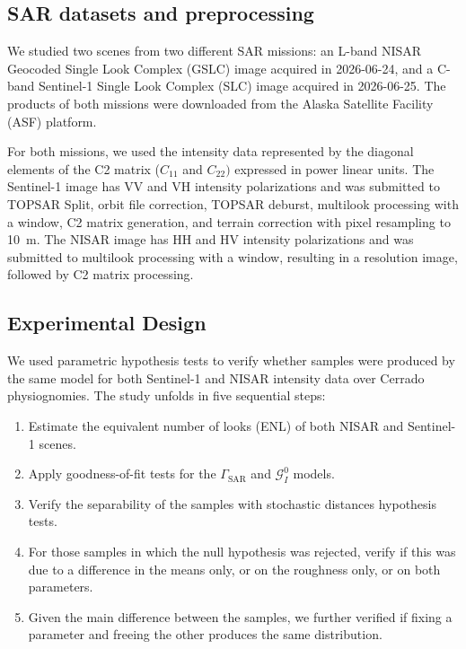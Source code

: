 \subsection{SAR datasets and preprocessing}

We studied two scenes from two different SAR missions: an L-band NISAR Geocoded Single Look Complex (GSLC) image acquired in 2026-06-24, and a C-band Sentinel-1 Single Look Complex (SLC) image acquired in 2026-06-25.
The products of both missions were downloaded from the Alaska Satellite Facility (ASF) platform.

For both missions, we used the intensity data represented by the diagonal elements of the C2 matrix ($C_{11}$ and $C_{22})$ expressed in power linear units.
The Sentinel-1 image has $\text{VV}$ and $\text{VH}$ intensity polarizations and was submitted to TOPSAR Split, orbit file correction, TOPSAR deburst, multilook processing with a  window, C2 matrix generation, and terrain correction with pixel resampling to \qty{10}{\meter}.
The NISAR image has $\text{HH}$ and $\text{HV}$ intensity polarizations and was submitted to multilook processing with a  window, resulting in a  resolution image, followed by C2 matrix processing.

\subsection{Experimental Design}

We used parametric hypothesis tests to verify whether samples were produced by the same model for both Sentinel-1 and NISAR intensity data over Cerrado physiognomies.
The study unfolds in five sequential steps: 
\begin{enumerate}
\item Estimate the equivalent number of looks (ENL) of both NISAR and Sentinel-1 scenes.
\item Apply goodness-of-fit tests for the $\Gamma_{\text{SAR}}$ and $\mathcal G^0_I$ models. 
\item Verify the separability of the samples with stochastic distances hypothesis tests.
\item For those samples in which the null hypothesis was rejected, verify if this was due to a difference in the means only, or on the roughness only, or on both parameters. 
\item Given the main difference between the samples, we further verified if fixing a parameter and freeing the other produces the same distribution.
\end{enumerate}

